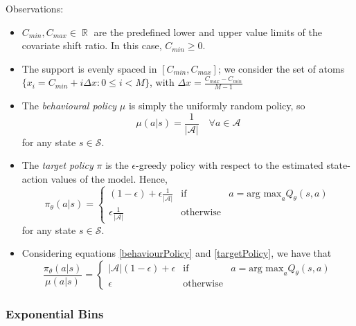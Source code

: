 \documentclass[12pt,a4paper,openright,twoside]{article}
\DeclareMathOperator*{\R}{\mathbb{R}}
\numberwithin{equation}{section}
\theoremstyle{definition}
\theoremstyle{remark}
\theoremstyle{plain}
\begin{document}
Observations:
\begin{itemize}
    \item $C_{min}, C_{max} \in \R$ are the predefined lower and upper value limits of the covariate shift ratio. In this case, $C_{min} \geq 0$.
    \item The support is evenly spaced in $[C_{min}, C_{max}]$; we consider the set of atoms $\{x_i = C_{min} + i \Delta x : 0 \leq i < M \}$, with $\Delta x = \frac{C_{max}-C_{min}}{M-1}$
    \item The \textit{behavioural policy} $\mu$ is simply the uniformly random policy, so 
    \begin{equation} \label{behaviourPolicy}
        \mu(a|s) = \frac{1}{|\mathcal{A}|} \quad \forall a \in \mathcal{A}
    \end{equation}
    for any state $s \in \mathcal{S}$.
    \item The \textit{target policy} $\pi$ is the $\epsilon$-greedy policy with respect to the estimated state-action values of the model. Hence,%
    \begin{equation} \label{targetPolicy}
        \pi_\theta (a|s) = 
        \left\{ 
            \begin{array}{lcc}
                (1-\epsilon)+\epsilon \frac{1}{|\mathcal{A}|} &   \text{if} & a = \text{arg max}_a Q_\theta(s,a) \\
                \epsilon \frac{1}{|\mathcal{A}|} &  \text{otherwise} &
            \end{array}
        \right. 
    \end{equation}
   for any state $s \in \mathcal{S}$.
   \item Considering equations \ref{behaviourPolicy} and \ref{targetPolicy}, we have that
   \begin{equation} \label{policyQuotient}
        \frac{\pi_\theta (a|s)}{\mu(a|s)} = 
        \left\{ 
            \begin{array}{lcc}
                |\mathcal{A}|(1-\epsilon)+\epsilon  &   \text{if} & a = \text{arg max}_a Q_\theta(s,a) \\
                \epsilon  &  \text{otherwise} &
            \end{array}
        \right. 
    \end{equation}
\end{itemize}


\subsubsection*{Exponential Bins}
\end{document}
